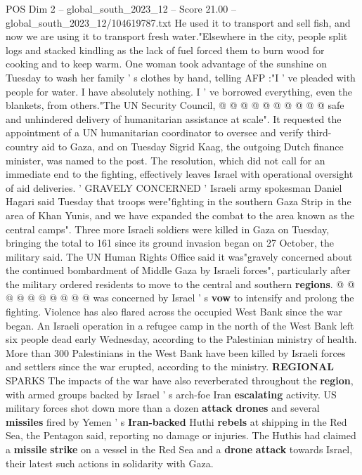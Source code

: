 \begin{textsample}{POS Dim 2 – global\_south\_2023\_12 – Score 21.00 – global\_south\_2023\_12/104619787.txt}
He used it to transport and sell fish, and now we are using it to transport fresh water."Elsewhere in the city, people split logs and stacked kindling as the lack of fuel forced them to burn wood for cooking and to keep warm.
One woman took advantage of the sunshine on Tuesday to wash her family ' s clothes by hand, telling AFP :"I ' ve pleaded with people for water.
I have absolutely nothing.
I ' ve borrowed everything, even the blankets, from others."The UN Security Council, @ @ @ @ @ @ @ @ @ @ safe and unhindered delivery of humanitarian assistance at scale".
It requested the appointment of a UN humanitarian coordinator to oversee and verify third-country aid to Gaza, and on Tuesday Sigrid Kaag, the outgoing Dutch finance minister, was named to the post.
The resolution, which did not call for an immediate end to the fighting, effectively leaves Israel with operational oversight of aid deliveries. ' GRAVELY CONCERNED ' Israeli army spokesman Daniel Hagari said Tuesday that troops were"fighting in the southern Gaza Strip in the area of Khan Yunis, and we have expanded the combat to the area known as the central camps".
Three more Israeli soldiers were killed in Gaza on Tuesday, bringing the total to 161 since its ground invasion began on 27 October, the military said.
The UN Human Rights Office said it was"gravely concerned about the continued bombardment of Middle Gaza by Israeli forces", particularly after the military ordered residents to move to the central and southern \textbf{regions}. @ @ @ @ @ @ @ @ @ @ was concerned by Israel ' s \textbf{vow} to intensify and prolong the fighting.
Violence has also flared across the occupied West Bank since the war began.
An Israeli operation in a refugee camp in the north of the West Bank left six people dead early Wednesday, according to the Palestinian ministry of health.
More than 300 Palestinians in the West Bank have been killed by Israeli forces and settlers since the war erupted, according to the ministry. \textbf{REGIONAL} SPARKS The impacts of the war have also reverberated throughout the \textbf{region}, with armed groups backed by Israel ' s arch-foe Iran \textbf{escalating} activity.
US military forces shot down more than a dozen \textbf{attack} \textbf{drones} and several \textbf{missiles} fired by Yemen ' s \textbf{Iran-backed} Huthi \textbf{rebels} at shipping in the Red Sea, the Pentagon said, reporting no damage or injuries.
The Huthis had claimed a \textbf{missile} \textbf{strike} on a vessel in the Red Sea and a \textbf{drone} \textbf{attack} towards Israel, their latest such actions in solidarity with Gaza.

\end{textsample}
